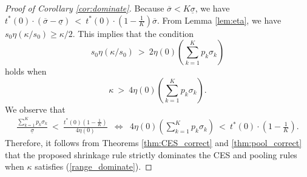 \documentclass[12pt,a4paper]{article}
\begin{document}
\begin{proof}[Proof of Corollary \ref{cor:dominate}]
Because $\overline{\sigma} < K \underline{\sigma}$, we have $t^{\ast}(0) \cdot (\overline{\sigma} - \underline{\sigma}) \ < \ t^{\ast}(0) \cdot \left( 1-\frac{1}{K} \right) \overline{\sigma}$. From Lemma \ref{lem:eta}, we have $s_0 \eta(\kappa / s_0) \geq \kappa /2$. This implies that the condition 
$$
s_0 \eta(\kappa/s_0) \ > \ 2\eta(0) \left( \sum_{k=1}^K p_k \sigma_k \right)
$$
holds when
\begin{equation}
\kappa \ > \ 4 \eta(0) \left( \sum_{k=1}^K p_k \sigma_k \right). \nonumber
\end{equation}
We observe that
\begin{eqnarray*}
\frac{\sum_{k=1}^K p_k \sigma_k}{\underline{\sigma}} \ < \ \frac{t^{\ast}(0) \left( 1- \frac{1}{K} \right)}{4 \eta(0)} & \Leftrightarrow & 4 \eta(0) \left( \sum_{k=1}^K p_k \sigma_k \right) \ < \ t^{\ast}(0) \cdot \left( 1-\frac{1}{K} \right).
\end{eqnarray*}
Therefore, it follows from Theorems \ref{thm:CES_correct} and \ref{thm:pool_correct} that the proposed shrinkage rule strictly dominates the CES and pooling rules when $\kappa$ satisfies (\ref{range_dominate}).
\end{proof}\vspace{0.1in}
\end{document}
